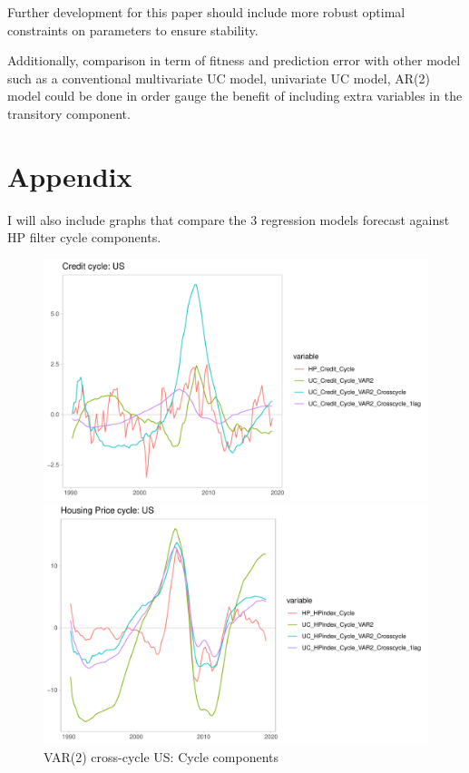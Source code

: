 \documentclass[fleqn]{article}
\begin{document}
\begin{outline}[enumerate]
		Further development for this paper should include more robust optimal constraints on parameters to ensure stability. 
		
		Additionally, comparison in term of fitness and prediction error with other model such as a conventional multivariate UC model, univariate UC model, AR(2) model could be done in order gauge the benefit of including extra variables in the transitory component.
		
				
		\section*{Appendix}

		I will also include graphs that compare the 3 regression models forecast against HP filter cycle components.
		
		\clearpage
		
		
		\begin{figure}[h!]
			\caption{VAR(2) cross-cycle US: Cycle components}	
			\centerline{\includegraphics[scale=0.7]{../Graphs/Credit_cycle_US.pdf}}
			\centerline{\includegraphics[scale=0.7]{../Graphs/HP_cycle_US.pdf}}
		\end{figure}
		

\end{outline}
\end{document}
